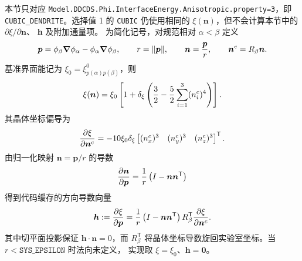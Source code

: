 \documentclass[UTF8,a4paper,11pt]{ctexart}
\newcommand{\grad}{\bm{\nabla}}
\newcommand{\vct}[1]{\bm{#1}}
\newcommand{\code}[1]{\texttt{#1}}
\begin{document}
本节只对应
\code{Model.DDCDS.Phi.InterfaceEnergy.Anisotropic.property=3}，即
\code{CUBIC\_DENDRITE}。选择值 1 的 \code{CUBIC} 仍使用相同的
$\xi(\vct n)$，但不会计算本节中的 $\partial\xi/\partial\vct n$、
$\vct h$ 及附加通量项。
为简化记号，对规范相对 $\alpha<\beta$ 定义
\begin{equation}
 \vct p=\phi_\beta\grad\phi_\alpha-\phi_\alpha\grad\phi_\beta,
 \qquad r=\lVert\vct p\rVert,
 \qquad \vct n={\vct p\over r},
 \qquad \vct n^c=R_\beta\vct n .
 \label{eq:cubic-p}
\end{equation}
基准界面能记为 $\xi_0=\xi^0_{p(\alpha)p(\beta)}$，则
\begin{equation}
 \xi(\vct n)=\xi_0\left[1+\delta_\xi\left(
 {3\over2}-{5\over2}\sum_{i=1}^3(n_i^c)^4\right)\right].
 \label{eq:cubic-xi}
\end{equation}
其晶体坐标偏导为
\begin{equation}
 {\partial\xi\over\partial\vct n^c}
 =-10\xi_0\delta_\xi
 \begin{bmatrix}(n_x^c)^3&(n_y^c)^3&(n_z^c)^3\end{bmatrix}^{\mathsf T}.
 \label{eq:dxi-dnc}
\end{equation}
由归一化映射 $\vct n=\vct p/r$ 的导数
\begin{equation}
 {\partial\vct n\over\partial\vct p}
 ={1\over r}\left(I-\vct n\vct n^{\mathsf T}\right)
\end{equation}
得到代码缓存的方向导数向量
\begin{equation}
 \vct h:={\partial\xi\over\partial\vct p}
 ={1\over r}\left(I-\vct n\vct n^{\mathsf T}\right)
 R_\beta^{\mathsf T}{\partial\xi\over\partial\vct n^c}.
 \label{eq:cubic-h}
\end{equation}
其中切平面投影保证 $\vct h\cdot\vct n=0$，而 $R_\beta^{\mathsf T}$
将晶体坐标导数旋回实验室坐标。当 $r<\code{SYS\_EPSILON}$ 时法向未定义，
实现取 $\xi=\xi_0$、$\vct h=\vct0$。
\end{document}
